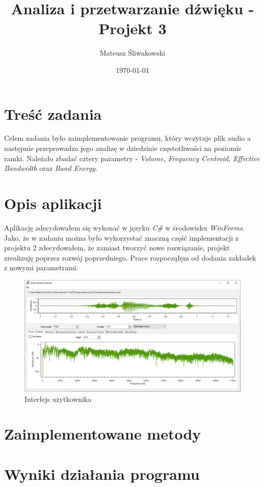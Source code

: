 \documentclass{article}
\title{Analiza i przetwarzanie dźwięku - Projekt 3}
\date{\today}
\author{Mateusz Śliwakowski}
\begin{document}
  \maketitle
  
\section{Treść zadania}
Celem zadania było zaimplementowanie programu, który wczytuje plik audio a następnie przeprowadza jego analizę w dziedzinie częstotliwości na poziomie ramki. Należało zbadać cztery parametry - \textit{Volume, Frequency Centroid, Effective Bandwidth} oraz \textit{Band Energy}.

\section{Opis aplikacji}

Aplikację zdecydowałem się wykonać w języku \textit{C\#} w środowisku \textit{WinForms}. Jako, że w zadaniu można było wykorzystać znaczną część implementacji z projektu 2 zdecydowałem, że zamiast tworzyć nowe rozwiązanie, projekt zrealizuję poprzez rozwój poprzedniego. Prace rozpocząłęm od dodania zakładek z nowymi parametrami.

\begin{figure}[H]
\includegraphics[width=6in]{scr1.png}
\centering
\caption{Interfejs użytkownika}
\label{fig:interface}
\end{figure}

\section{Zaimplementowane metody}

\section{Wyniki działania programu}
\end{document}
